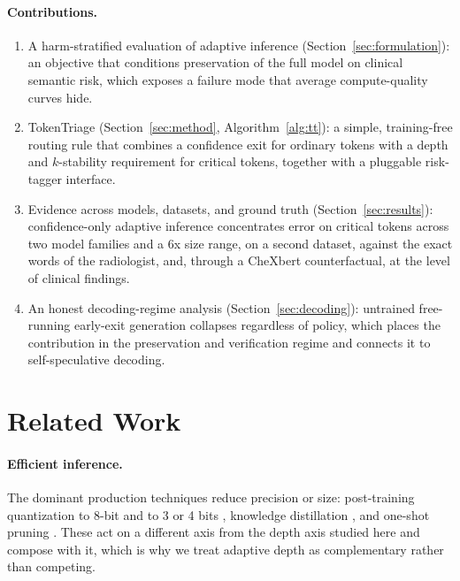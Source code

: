 \documentclass[11pt]{article}
\newcommand{\method}{\mbox{TokenTriage}}
\begin{document}
\paragraph{Contributions.}
\begin{enumerate}[leftmargin=1.5em,itemsep=2pt,topsep=2pt]
  \item A harm-stratified evaluation of adaptive inference (Section~\ref{sec:formulation}): an objective
        that conditions preservation of the full model on clinical semantic risk, which exposes a
        failure mode that average compute-quality curves hide.
  \item \method{} (Section~\ref{sec:method}, Algorithm~\ref{alg:tt}): a simple, training-free routing
        rule that combines a confidence exit for ordinary tokens with a depth and $k$-stability
        requirement for critical tokens, together with a pluggable risk-tagger interface.
  \item Evidence across models, datasets, and ground truth (Section~\ref{sec:results}): confidence-only
        adaptive inference concentrates error on critical tokens across two model families and a 6x size
        range, on a second dataset, against the exact words of the radiologist, and, through a CheXbert
        counterfactual, at the level of clinical findings.
  \item An honest decoding-regime analysis (Section~\ref{sec:decoding}): untrained free-running
        early-exit generation collapses regardless of policy, which places the contribution in the
        preservation and verification regime and connects it to self-speculative decoding.
\end{enumerate}

\section{Related Work}
\label{sec:related}

\paragraph{Efficient inference.}
The dominant production techniques reduce precision or size: post-training quantization to 8-bit
\cite{llmint8} and to 3 or 4 bits \cite{gptq,awq}, knowledge distillation \cite{distillation2015,distilbert2019},
and one-shot pruning \cite{sparsegpt2023}. These act on a different axis from the depth axis studied
here and compose with it, which is why we treat adaptive depth as complementary rather than competing.
\end{document}
